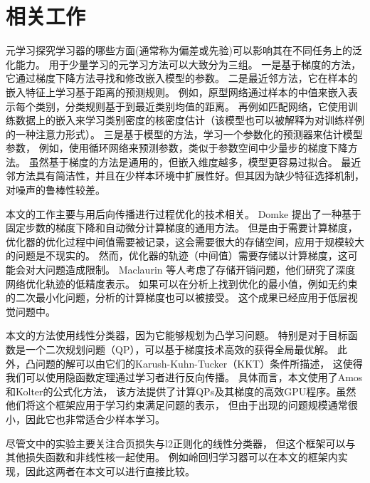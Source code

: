 \chapter{相关工作}
元学习探究学习器的哪些方面(通常称为偏差或先验)可以影响其在不同任务上的泛化能力。
用于少量学习的元学习方法可以大致分为三组。
一是基于梯度的方法，它通过梯度下降方法寻找和修改嵌入模型的参数。
二是最近邻方法，它在样本的嵌入特征上学习基于距离的预测规则。
例如，原型网络通过样本的中值来嵌入表示每个类别，分类规则基于到最近类别均值的距离。
再例如匹配网络，它使用训练数据上的嵌入来学习类别密度的核密度估计（该模型也可以被解释为对训练样例的一种注意力形式）。
三是基于模型的方法，学习一个参数化的预测器来估计模型参数，
例如，使用循环网络来预测参数，类似于参数空间中少量步的梯度下降方法。
虽然基于梯度的方法是通用的，但嵌入维度越多，模型更容易过拟合。
最近邻方法具有简洁性，并且在少样本环境中扩展性好。但其因为缺少特征选择机制，对噪声的鲁棒性较差。

本文的工作主要与用后向传播进行过程优化的技术相关。
Domke 提出了一种基于固定步数的梯度下降和自动微分计算梯度的通用方法。
但是由于需要计算梯度，优化器的优化过程中间值需要被记录，这会需要很大的存储空间，应用于规模较大
的问题是不现实的。
然而，优化器的轨迹（中间值）需要存储以计算梯度，这可能会对大问题造成限制。
Maclaurin 等人考虑了存储开销问题，他们研究了深度网络优化轨迹的低精度表示。
如果可以在分析上找到优化的最小值，例如无约束的二次最小化问题，分析的计算梯度也可以被接受。
这个成果已经应用于低层视觉问题中。

本文的方法使用线性分类器，因为它能够规划为凸学习问题。
特别是对于目标函数是一个二次规划问题（QP），可以基于梯度技术高效的获得全局最优解。
此外，凸问题的解可以由它们的Karush-Kuhn-Tucker（KKT）条件所描述，
这使得我们可以使用隐函数定理通过学习者进行反向传播。
具体而言，本文使用了Amos和Kolter的公式化方法，
该方法提供了计算QPs及其梯度的高效GPU程序。虽然他们将这个框架应用于学习约束满足问题的表示，
但由于出现的问题规模通常很小，因此它也非常适合少样本学习。

尽管文中的实验主要关注合页损失与l2正则化的线性分类器，
但这个框架可以与其他损失函数和非线性核一起使用。
例如岭回归学习器可以在本文的框架内实现，因此这两者在本文可以进行直接比较。